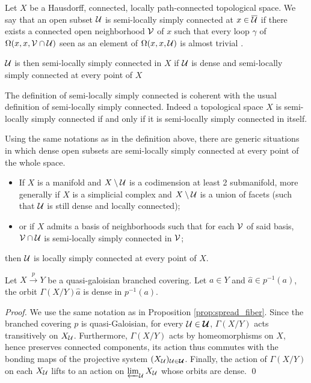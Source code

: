 \begin{defi} Let $X$ be a Hausdorff, connected, locally path-connected topological space.  We say that an open subset $\mathcal{U}$ is semi-locally simply connected at $x \in \overline {\mathcal{U}}$ if there exists a connected open neighborhood $\mathcal V$ of $x$ such that every loop $\gamma$ of $\Omega(x,x,\mathcal V\cap \mathcal{U})$ seen as an element of $\Omega(x,x,\mathcal{U})$ is almost trivial . 

$\mathcal{U}$ is then semi-locally simply connected in $X$ if $\mathcal{U}$ is dense and semi-locally simply connected at every point of $X$
\end{defi}
\begin{rem}
 The definition of semi-locally simply connected is coherent with the usual definition of semi-locally simply connected. Indeed a topological space $X$ is semi-locally simply connected if and only if it is semi-locally simply connected in  itself.
\end{rem}

\begin{rem} \label{rem:simple_cases} Using the same notations as in the definition above, there are generic situations in which dense open subsets are semi-locally simply connected at every point of the whole space.
\begin{itemize}
 \item If $X$ is a manifold and $X\setminus \mathcal{U}$ is a codimension at least 2 submanifold, more generally if $X$ is a simplicial complex and $X\setminus \mathcal{U}$ is a union of facets (such that $\mathcal{U}$ is still dense and locally connected);
 \item  or if $X$ admits a basis of neighborhoods such that for each $\mathcal V$ of said basis, $\mathcal V\cap \mathcal{U}$ is semi-locally simply connected in $\mathcal V$;
\end{itemize}
then $\mathcal{U}$ is locally simply connected at every point of $X$. 
\end{rem}



\begin{lem}\label{lem:dense_orbits}
 Let $X\xrightarrow{p} Y$ be a quasi-galoisian branched covering. Let $a\in Y$ and $\hat a \in p^{-1}(a)$, the orbit  $\Gamma(X/Y)\hat a$  is dense in $p^{-1}(a)$.
\end{lem}
\begin{proof} We use the same notation as in Proposition \ref{prop:spread_fiber}. 
  Since the branched covering $p$ is quasi-Galoisian, for every $\mathcal{U}\in \boldsymbol{\mathcal{U}}$, $\Gamma(X/Y)$ acts transitively on $X_{\mathcal{U}}$. Furthermore, $\Gamma(X/Y)$ acts by homeomorphisms on $X$, hence preserves connected components, its action thus commutes with the bonding maps of the projective system $(X_{\mathcal{U}})_{\mathcal{U}\in \boldsymbol{\mathcal{U}}}$. Finally, the action of $\Gamma(X/Y)$ on each $X_{\mathcal{U}}$ lifts to an action on $\varprojlim_{\mathcal{U}} X_{\mathcal{U}}$ whose orbits are dense.
\qed\end{proof}



